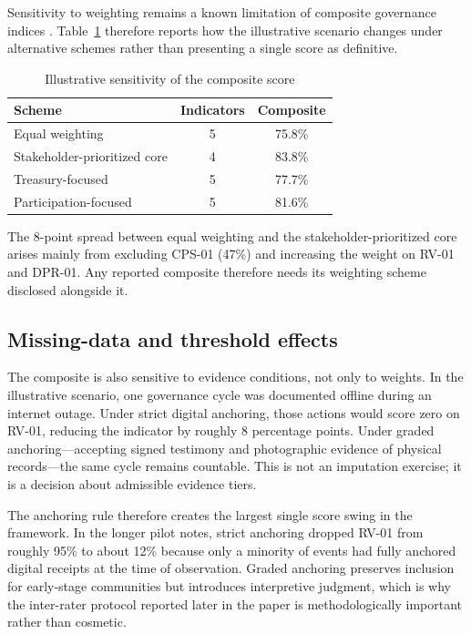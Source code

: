 \documentclass[review,onecolumn]{elsarticle}
\begin{document}
Sensitivity to weighting remains a known limitation of composite governance indices \cite{langbein2010,oman2010}. Table~\ref{tab:sensitivity} therefore reports how the illustrative scenario changes under alternative schemes rather than presenting a single score as definitive.

\begin{table}[t]
\caption{Illustrative sensitivity of the composite score}
\label{tab:sensitivity}
\small
\begin{tabularx}{\columnwidth}{l c c}
\toprule
Scheme & Indicators & Composite \\
\midrule
Equal weighting & 5 & 75.8\% \\
Stakeholder-prioritized core & 4 & 83.8\% \\
Treasury-focused & 5 & 77.7\% \\
Participation-focused & 5 & 81.6\% \\
\bottomrule
\end{tabularx}
\end{table}

The 8-point spread between equal weighting and the stakeholder-prioritized core arises mainly from excluding CPS-01 (47\%) and increasing the weight on RV-01 and DPR-01. Any reported composite therefore needs its weighting scheme disclosed alongside it.

\subsection{Missing-data and threshold effects}

The composite is also sensitive to evidence conditions, not only to weights. In the illustrative scenario, one governance cycle was documented offline during an internet outage. Under strict digital anchoring, those actions would score zero on RV-01, reducing the indicator by roughly 8 percentage points. Under graded anchoring---accepting signed testimony and photographic evidence of physical records---the same cycle remains countable. This is not an imputation exercise; it is a decision about admissible evidence tiers.

The anchoring rule therefore creates the largest single score swing in the framework. In the longer pilot notes, strict anchoring dropped RV-01 from roughly 95\% to about 12\% because only a minority of events had fully anchored digital receipts at the time of observation. Graded anchoring preserves inclusion for early-stage communities but introduces interpretive judgment, which is why the inter-rater protocol reported later in the paper is methodologically important rather than cosmetic.
\end{document}
